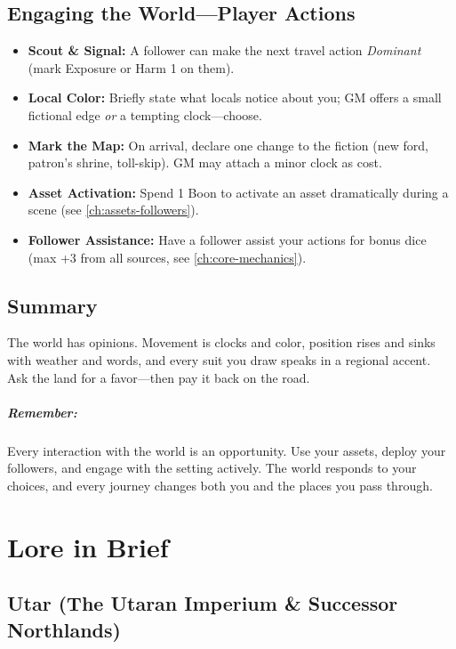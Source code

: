 \section{Engaging the World—Player Actions}
\label{sec:player-actions-world}
\begin{itemize}
\item \textbf{Scout \& Signal:} A follower can make the next travel action \emph{Dominant} (mark Exposure or Harm 1 on them).
\item \textbf{Local Color:} Briefly state what locals notice about you; GM offers a small fictional edge \emph{or} a tempting clock—choose.
\item \textbf{Mark the Map:} On arrival, declare one change to the fiction (new ford, patron's shrine, toll-skip). GM may attach a minor clock as cost.
\item \textbf{Asset Activation:} Spend 1 Boon to activate an asset dramatically during a scene (see \ref{ch:assets-followers}).
\item \textbf{Follower Assistance:} Have a follower assist your actions for bonus dice (max +3 from all sources, see \ref{ch:core-mechanics}).
\end{itemize}

\section{Summary}
\label{sec:world-summary}
The world has opinions. Movement is clocks and color, position rises and sinks with weather and words, and every suit you draw speaks in a regional accent. Ask the land for a favor—then pay it back on the road.

\paragraph{Remember:} Every interaction with the world is an opportunity. Use your assets, deploy your followers, and engage with the setting actively. The world responds to your choices, and every journey changes both you and the places you pass through.

\clearpage

\chapter{Lore in Brief}
\label{ch:lore-brief}

\section{Utar (The Utaran Imperium \& Successor Northlands)}
\label{sec:lore-utar}

